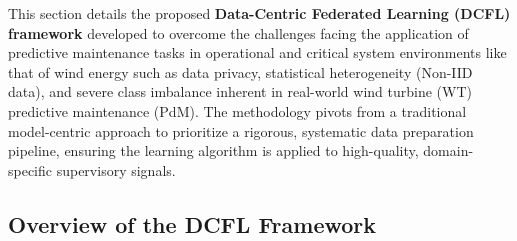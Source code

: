 \documentclass[12pt]{article}
\begin{document}
This section details the proposed \textbf{Data-Centric Federated Learning (DCFL) framework} developed to overcome the challenges facing the application of predictive maintenance tasks in operational and critical system environments like that of wind energy such as data privacy, statistical heterogeneity (Non-IID data), and severe class imbalance inherent in real-world wind turbine (WT) predictive maintenance (PdM). The methodology pivots from a traditional model-centric approach to prioritize a rigorous, systematic data preparation pipeline, ensuring the learning algorithm is applied to high-quality, domain-specific supervisory signals.


\subsection{Overview of the DCFL Framework}

\end{document}
